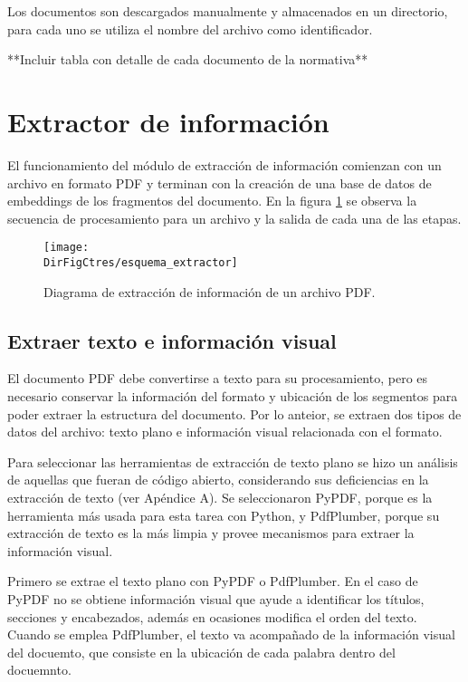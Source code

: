 Los documentos son descargados manualmente y almacenados en un directorio,
para cada uno se utiliza el nombre del archivo como identificador.

**Incluir tabla con detalle de cada documento de la normativa**

\section{Extractor de información}

El funcionamiento del módulo de extracción de información comienzan con un
archivo en formato PDF y terminan con la creación de una base de datos de
embeddings de los fragmentos del documento. En la figura
\ref{fig:esquema_extractor} se observa la secuencia de procesamiento para un
archivo y la salida de cada una de las etapas.

\begin{figure}[]
    \centering
    \texttt{[image: \\DirFigCtres/esquema\_extractor]}
    \caption{Diagrama de extracción de información de un archivo PDF.}
    \label{fig:esquema_extractor}
\end{figure}

\subsection{Extraer texto e información visual}

El documento PDF debe convertirse a texto para su procesamiento, pero es
necesario conservar la información del formato y ubicación de los segmentos
para poder extraer la estructura del documento. Por lo anteior, se extraen dos
tipos de datos del archivo: texto plano e información visual relacionada con
el formato.

Para seleccionar las herramientas de extracción de texto plano se hizo un
análisis de aquellas que fueran de código abierto, considerando sus
deficiencias en la extracción de texto (ver Apéndice A). Se seleccionaron
PyPDF, porque es la herramienta más usada para esta tarea con Python, y
PdfPlumber, porque su extracción de texto es la más limpia y provee mecanismos
para extraer la información visual.

Primero se extrae el texto plano con PyPDF o PdfPlumber. En el caso de PyPDF
no se obtiene información visual que ayude a identificar los títulos, secciones
y encabezados, además en ocasiones modifica el orden del texto. Cuando se
emplea PdfPlumber, el texto va acompañado de la información visual del docuemto,
que consiste en la ubicación de cada palabra dentro del docuemnto.

